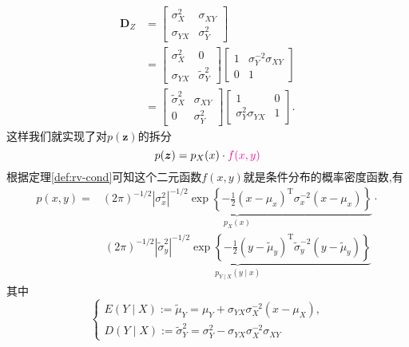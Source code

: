 \documentclass[cn,10pt,citestyle=gb7714-2015,bibstyle=gb7714-2015]{elegantbook}
\newcommand{\mT}{\mathrm{T}}
\begin{document}
\begin{align*}
  \bm{D}_Z&=\begin{bmatrix}
    \sigma_X^2&\sigma_{XY}\\
    \sigma_{YX}&\sigma_Y^2
  \end{bmatrix}\\
  &=\begin{bmatrix}
    \sigma_X^2&0\\
    \sigma_{YX}&\widetilde{\sigma}_Y^2
  \end{bmatrix}
  \begin{bmatrix}
    1&\sigma_Y^{-2}\sigma_{XY}\\
    0&1
  \end{bmatrix}\\
  &=\begin{bmatrix}
    \widetilde{\sigma}_X^2&\sigma_{XY}\\
    0&\sigma_Y^2
  \end{bmatrix}
  \begin{bmatrix}
    1&0\\
    \sigma_Y^2\sigma_{YX}&1
  \end{bmatrix}.
\end{align*}
这样我们就实现了对$p(\bm{z})$的拆分
\[
    p(\bm{z})=p_X(x)\cdot \textcolor{magenta}{f(x,y)}
\]
根据定理\ref{def:rv-cond}可知这个二元函数$f(x,y)$就是条件分布的概率密度函数,有
  \begin{align}
    p(x,y)=&\underbrace{(2\pi)^{-1/2}|\sigma_x^2|^{-1/2}\exp\left\{-\frac12(x-\mu_x)^\mT\sigma_x^{-2}(x-\mu_x)\right\}}_{p_X(x)}\cdot\\
  &\ \underbrace{(2\pi)^{-1/2}|\widetilde{\sigma}_y^2|^{-1/2}\exp\left\{-\frac12(y-\widetilde{\mu}_y)^\mT\widetilde{\sigma}_y^{-2}(y-\widetilde{\mu}_y)\right\}}_{p_{Y\mid X}(y\mid x)}
  \end{align}
  其中
  \begin{equation}
    \begin{cases}
      E(Y\mid X):=\widetilde{\mu}_Y=\mu_Y+\sigma_{YX}\sigma_{X}^{-2}(x-\mu_X),\\
      D(Y\mid X):=\widetilde{\sigma}_Y^2=\sigma_Y^2-\sigma_{YX}\sigma_{X}^{-2}\sigma_{XY}
    \end{cases}
  \end{equation}
\end{document}
